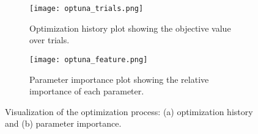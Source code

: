 \documentclass{article}
\begin{document}
\begin{figure}[h]
\centering
\begin{subfigure}{0.48\textwidth}
    \texttt{[image: optuna\_trials.png]}
    \caption{Optimization history plot showing the objective value over trials.}
    \label{fig:optimization_history}
\end{subfigure}
\hfill
\begin{subfigure}{0.48\textwidth}
    \texttt{[image: optuna\_feature.png]}
    \caption{Parameter importance plot showing the relative importance of each parameter.}
    \label{fig:parameter_importances}
\end{subfigure}
\caption{Visualization of the optimization process: (a) optimization history and (b) parameter importance.}
\label{fig:optimization_plots}
\end{figure}
\end{document}
